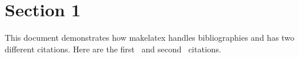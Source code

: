 \documentclass[letterpaper,12pt]{article}
\begin{document}
\section{Section 1}


This document demonstrates how makelatex handles bibliographies and has two different citations. Here are the first~\cite{chicago} and second~\cite{latexbook} citations.

\lipsum[1-3]



\printbibliography
\end{document}
